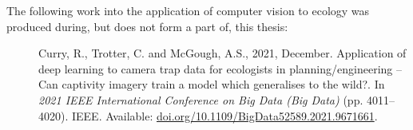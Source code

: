\noindent The following work into the application of computer vision to ecology was produced during, but does not form a part of, this thesis:

\begin{description}
	\item[\cite{curry_application_2021}] Curry, R., Trotter, C. and McGough, A.S., 2021, December. Application of deep learning to camera trap data for ecologists in planning/engineering – Can captivity imagery train a model which generalises to the wild?. In \textit{2021 IEEE International Conference on Big Data (Big Data)} (pp. 4011--4020). IEEE. Available: \href{	https://doi.org/10.1109/BigData52589.2021.9671661}{doi.org/10.1109/BigData52589.2021.9671661}.
\end{description}



